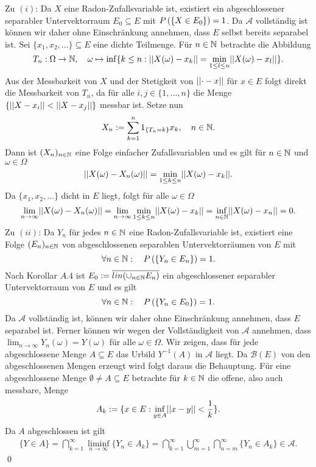 \begin{proof*}
    Zu $(i)$:
    Da $X$ eine Radon-Zufallsvariable ist, existiert ein abgeschlossener separabler Untervektorraum $E_0 \subseteq E$ mit $P\left(\left\{ X \in E_0 \right\}\right) = 1$. 
    Da $\mathcal{A}$ vollständig ist können wir daher ohne Einschränkung annehmen, dass $E$ selbst bereits separabel ist. 
    Sei $\{x_1,x_2,... \} \subseteq E$ eine dichte Teilmenge. Für $n \in \mathbb{N}$ betrachte die Abbildung
    $$
        T_n: \Omega \to \mathbb{N}, \quad \omega \mapsto \inf\{k \leq n: \lvert\lvert X(\omega)-x_k \rvert\rvert = \min_{1\leq l \leq n}\lvert\lvert X(\omega)-x_l \rvert\rvert\}.
    $$ 
    Aus der Messbarkeit von $X$ und der Stetigkeit von $\lvert\lvert \cdot - x \rvert\rvert$ für $x \in E$ folgt direkt die Messbarkeit von $T_n$,
    da für alle $i,j \in \{1,...,n\}$ die Menge $\{\lvert\lvert X - x_i \rvert\rvert < \lvert\lvert X - x_j \rvert\rvert\}$ messbar ist. Setze nun
    $$
        X_n := \sum_{k=1}^n 1_{\{T_n = k\}}x_k, \quad n \in \mathbb{N}.
    $$
    Dann ist $(X_n)_{n \in \mathbb{N}}$ eine Folge einfacher Zufallsvariablen und es gilt für $n \in \mathbb{N}$ und $\omega \in \Omega$
    $$
        \lvert\lvert X(\omega)-X_n(\omega) \rvert\rvert = \min_{1\leq k \leq n}\lvert\lvert X(\omega)-x_k \rvert\rvert.
    $$
    Da $\{x_1,x_2,...\}$ dicht in $E$ liegt, folgt für alle $\omega \in \Omega$
    $$
        \lim_{n \to \infty}\lvert\lvert X(\omega) - X_n(\omega) \rvert\rvert = \lim_{n \to \infty}\min_{1\leq k \leq n}\lvert\lvert X(\omega)- x_k \rvert\rvert = \inf_{n \in \mathbb{N}} \lvert\lvert X(\omega)- x_n \rvert\rvert = 0. 
    $$
    Zu $(ii)$: Da $Y_n$ für jedes $n \in \mathbb{N}$ eine Radon-Zufallsvariable ist, existiert eine Folge $(E_n)_{n \in \mathbb{N}}$ von abgeschlossenen separablen Untervektorräumen von $E$ mit 
    $$
        \forall n \in \mathbb{N}: \quad P\left(\left\{ Y_n \in E_n \right\}\right) = 1. 
    $$
    Nach Korollar $A.4$ ist $E_0 := \overline{lin(\cup_{n \in \mathbb{N}}E_n)}$ ein abgeschlossener separabler Untervektorraum von $E$ und es gilt  
    $$
        \forall n \in \mathbb{N}: \quad P\left(\left\{ Y_n \in E_0 \right\}\right) = 1. 
    $$
    Da $\mathcal{A}$ vollständig ist, können wir daher ohne Einschränkung annehmen, dass $E$ separabel ist. 
    Ferner können wir wegen der Vollständigkeit von $\mathcal{A}$ annehmen, dass $\lim_{n \to \infty} Y_n(\omega) = Y(\omega)$ für alle $\omega \in \Omega$. 
    Wir zeigen, dass für jede abgeschlossene Menge $A \subseteq E$ das Urbild $Y^{-1}(A)$ in $\mathcal{A}$ liegt. 
    Da $\mathcal{B}(E)$ von den abgeschlossenen Mengen erzeugt wird folgt daraus die Behauptung. 
    Für eine abgeschlossene Menge $\emptyset \neq A \subseteq E$ betrachte für $k \in \mathbb{N}$ die offene, also auch messbare, Menge 
    $$
        A_k := \{x \in E: \inf_{y\in A}\lvert\lvert x-y \rvert\rvert < \frac{1}{k}\}.
    $$
    Da $A$ abgeschlossen ist gilt 
    \begin{align*}
        \{Y \in A\} = \bigcap_{k=1}^{\infty}\liminf_{n \to \infty}\{Y_n \in A_k\} = \bigcap_{k=1}^{\infty}\bigcup_{m=1}^{\infty}\bigcap_{n=m}^{\infty}\{Y_n \in A_k\}\in \mathcal{A}.
    \end{align*}     
    \qed 
\end{proof*}



